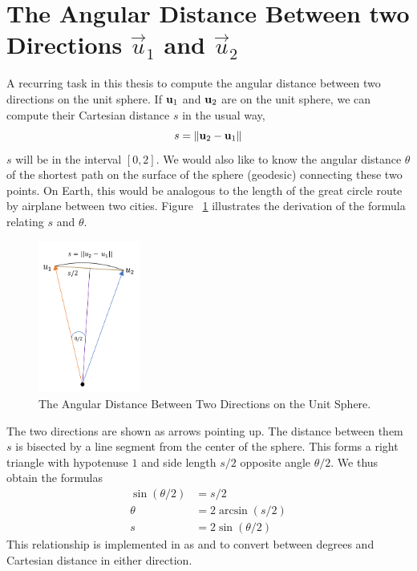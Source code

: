 \section{The Angular Distance Between two Directions $\vec{u}_1$ and $\vec{u}_2$}
\label{section_ztf_angle_diff}
A recurring task in this thesis to compute the angular distance between two directions on the unit sphere.
If $\mathbf{u}_1$ and $\mathbf{u}_2$ are on the unit sphere, we can compute their Cartesian distance $s$ in the usual way,
$$ s = \lVert\mathbf{u}_2 - \mathbf{u}_1\rVert$$
$s$ will be in the interval $[0, 2]$.
We would also like to know the angular distance $\theta$ of the shortest path 
on the surface of the sphere (geodesic) connecting these two points.
On Earth, this would be analogous to the length of the great circle route by airplane between two cities.
Figure ~\ref{fig:ang_distance} illustrates the derivation of the formula relating $s$ and $\theta$.
\begin{figure}[hbt!]
\begin{center}
\includegraphics[width=0.3\textwidth]{../figs/misc/angular_distance.png}
\end{center}
\caption[The Angular Distance Between Two Directions on the Unit Sphere]
{The Angular Distance Between Two Directions on the Unit Sphere.}
\label{fig:ang_distance}
\end{figure}
The two directions are shown as arrows pointing up.
The distance between them $s$ is bisected by a line segment from the center of the sphere.
This forms a right triangle with hypotenuse $1$ and side length $s/2$ opposite angle $\theta/2$.
We thus obtain the formulas
\begin{align*}
\sin (\theta / 2) &= s / 2 \\ 
\theta &= 2 \arcsin (s / 2) \\
s &= 2 \sin (\theta / 2)
\end{align*}
This relationship is implemented in  as  and  to convert between degrees and Cartesian distance in either direction.

